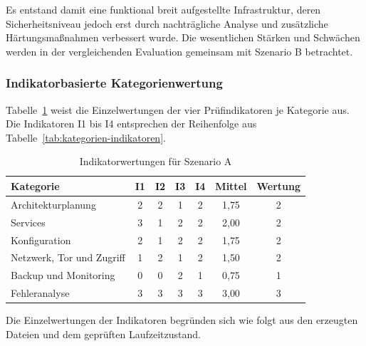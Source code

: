 Es entstand damit eine funktional breit aufgestellte Infrastruktur, deren Sicherheitsniveau jedoch erst durch nachträgliche Analyse und zusätzliche Härtungsmaßnahmen verbessert wurde. Die wesentlichen Stärken und Schwächen werden in der vergleichenden Evaluation gemeinsam mit Szenario B betrachtet.

\subsubsection{Indikatorbasierte Kategorienwertung}

Tabelle~\ref{tab:indikatoren-a} weist die Einzelwertungen der vier Prüfindikatoren je Kategorie aus. Die Indikatoren I1 bis I4 entsprechen der Reihenfolge aus Tabelle~\ref{tab:kategorien-indikatoren}.

\begin{table}[H]
\centering
\small
\begin{tabular}{p{} c c c c c c}
\hline
\textbf{Kategorie} & \textbf{I1} & \textbf{I2} & \textbf{I3} & \textbf{I4} & \textbf{Mittel} & \textbf{Wertung} \\
\hline
Architekturplanung        & 2 & 2 & 1 & 2 & 1{,}75 & 2 \\
Services                  & 3 & 1 & 2 & 2 & 2{,}00 & 2 \\
Konfiguration             & 2 & 1 & 2 & 2 & 1{,}75 & 2 \\
Netzwerk, Tor und Zugriff & 1 & 2 & 1 & 2 & 1{,}50 & 2 \\
Backup und Monitoring     & 0 & 0 & 2 & 1 & 0{,}75 & 1 \\
Fehleranalyse             & 3 & 3 & 3 & 3 & 3{,}00 & 3 \\
\hline
\end{tabular}
\caption{Indikatorwertungen für Szenario A}
\label{tab:indikatoren-a}
\end{table}

Die Einzelwertungen der Indikatoren begründen sich wie folgt aus den erzeugten
Dateien und dem geprüften Laufzeitzustand.

